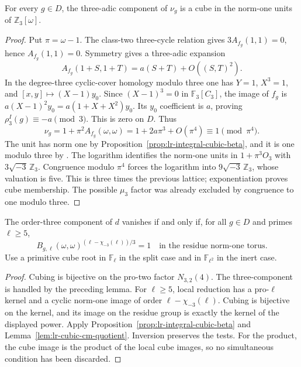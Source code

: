\begin{lemma}\label{lem:lr-wild-three-cube}
For every $g\in D$, the three-adic component of $\nu_g$ is a cube
in the norm-one units of $\mathbb Z_3[\omega]$.
\end{lemma}
\begin{proof}
Put $\pi=\omega-1$. The class-two three-cycle relation gives
$3A_{f_g}(1,1)=0$, hence $A_{f_g}(1,1)=0$.
Symmetry gives a three-adic expansion
\[
 A_{f_g}(1+S,1+T)=a(S+T)+O((S,T)^2).
\]
In the degree-three cyclic-cover homology modulo three one has
$Y=1$, $X^3=1$, and $[x,y]\mapsto(X-1)y_0$.
Since $(X-1)^3=0$ in $\mathbb F_3[C_3]$, the image of $f_g$ is
$a(X-1)^2y_0=a(1+X+X^2)y_0$.
Its $y_0$ coefficient is $a$, proving
$\rho_3^I(g)\equiv-a\pmod3$. This is zero on $D$. Thus
\[
 \nu_g=1+\pi^2A_{f_g}(\omega,\omega)
      =1+2a\pi^3+O(\pi^4)\equiv1\pmod{\pi^4}.
\]
The unit has norm one by
Proposition~\ref{prop:lr-integral-cubic-beta}, and it is one
modulo three by \cite[Lemma~15]{H17}.
The logarithm identifies the norm-one units in $1+\pi^3O_3$
with $3\sqrt{-3}\,\mathbb Z_3$. Congruence modulo $\pi^4$
forces the logarithm into $9\sqrt{-3}\,\mathbb Z_3$, whose
valuation is five. This is three times the previous lattice;
exponentiation proves cube membership. The possible $\mu_3$
factor was already excluded by congruence to one modulo three.
\end{proof}

\begin{theorem}\label{thm:lr-tame-cubic-gate}
The order-three component of $d$ vanishes if and only if, for
all $g\in D$ and primes $\ell\ge5$,
\begin{equation}
 B_{g,\ell}(\omega,\omega)^{(\ell-\chi_{-3}(\ell))/3}=1
 \quad\text{in the residue norm-one torus}.
 \label{eq:lr-tame-cubic-test}
\end{equation}
Use a primitive cube root in $\mathbb F_\ell$ in the split
case and in $\mathbb F_{\ell^2}$ in the inert case.
\end{theorem}
\begin{proof}
Cubing is bijective on the pro-two factor $N_{3,2}(4)$.
The three-component is handled by the preceding lemma.
For $\ell\ge5$, local reduction has a pro-$\ell$ kernel and a
cyclic norm-one image of order $\ell-\chi_{-3}(\ell)$.
Cubing is bijective on the kernel, and its image on the residue
group is exactly the kernel of the displayed power.
Apply Proposition~\ref{prop:lr-integral-cubic-beta} and
Lemma~\ref{lem:lr-cubic-cm-quotient}. Inversion preserves the tests.
For the product, the cube image is the product of the local
cube images, so no simultaneous condition has been discarded.
\end{proof}

